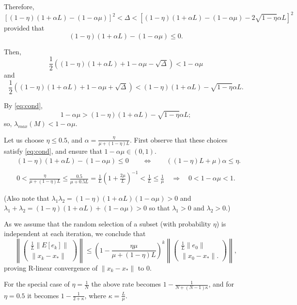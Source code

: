 \documentclass{article}
\begin{document}
Therefore,
\[
 \left[(1-\eta)(1+\alpha L)-(1-\alpha\mu)\right]^2<\Delta<\left[(1-\eta)(1+\alpha L)-(1-\alpha\mu)-2\sqrt{1-\eta}\alpha L\right]^2
\]
provided that
\begin{equation}
\label{eq:cond}
 (1-\eta)(1+\alpha L)-(1-\alpha\mu)\leq 0.
\end{equation}

\bigskip

Then,
\[
 \frac{1}{2}\left((1-\eta)(1+\alpha L)+1-\alpha\mu-\sqrt{\Delta}\right)< 1-\alpha\mu
\]
and
\[
 \frac{1}{2}\left((1-\eta)(1+\alpha L)+1-\alpha\mu+\sqrt{\Delta}\right)< (1-\eta)(1+\alpha L)-\sqrt{1-\eta}\alpha L.
\]

By \eqref{eq:cond}, 
\[
 1-\alpha\mu>(1-\eta)(1+\alpha L)-\sqrt{1-\eta}\alpha L;
\]
so, $\lambda_{max}(M)<1-\alpha\mu$.

\bigskip

Let us choose $\eta\leq 0.5$, and $\alpha=\displaystyle\frac{\eta}{\mu+(1-\eta)L}$.  First observe that these choices satisfy \eqref{eq:cond}, and ensure that $1-\alpha\mu\in(0,1)$.
\begin{align*}
 &(1-\eta)(1+\alpha L)-(1-\alpha\mu)\leq 0 \qquad \Leftrightarrow \qquad  ((1-\eta)L+\mu)\alpha\leq \eta.\\
 \\
 &0< \displaystyle\frac{\eta}{\mu+(1-\eta)L}\leq \frac{0.5}{\mu+0.5L} = \frac{1}{L}\left(1+\frac{2\mu}{L}\right)^{-1}<\frac{1}{L}\leq\frac{1}{\mu} \quad \Rightarrow \quad 0< 1-\alpha\mu < 1.
\end{align*}


\bigskip

\noindent
(Also note that $\lambda_1\lambda_2=(1-\eta)(1+\alpha L)(1-\alpha\mu)>0$ and $\lambda_1+\lambda_2=(1-\eta)(1+\alpha L)+(1-\alpha\mu)>0$ so that $\lambda_1>0$ and $\lambda_2>0$.)

\bigskip


As we assume that the random selection of a subset (with probability $\eta$) is independent at each iteration, we conclude that 
\[
 \left\|\begin{pmatrix} \displaystyle\frac{1}{L}\|E[e_k]\| \\
  \|x_k-x_\ast\|
 \end{pmatrix}\right\| \leq  \left(1-\displaystyle\frac{\eta\mu}{\mu+(1-\eta)L}\right)^k               
  \left\|\begin{pmatrix} \displaystyle\frac{1}{L}\|e_0\| \\
  \|x_0-x_\ast\|.
 \end{pmatrix} \right\|,
\]
proving R-linear convergence of $\|x_k-x_\ast\|$ to 0.

\bigskip

For the special case of $\eta=\displaystyle\frac{1}{N}$ the above rate becomes $1-\displaystyle\frac{1}{N+(N-1)\kappa}$, and for $\eta=0.5$ it becomes $1-\displaystyle\frac{1}{2+\kappa}$, where $\kappa=\displaystyle\frac{L}{\mu}$.
\end{document}
